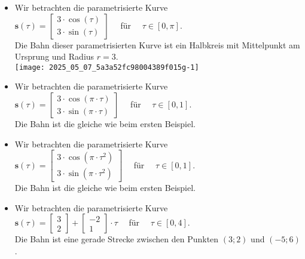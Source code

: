 \documentclass[10pt]{article}
\begin{document}
\begin{itemize}
  \item Wir betrachten die parametrisierte Kurve\\
$\mathbf{s}(\tau)=\left[\begin{array}{c}3 \cdot \cos (\tau) \\ 3 \cdot \sin (\tau)\end{array}\right] \quad$ für $\quad \tau \in[0, \pi]$.\\
Die Bahn dieser parametrisierten Kurve ist ein Halbkreis mit Mittelpunkt am Ursprung und Radius $r=3$.\\
\texttt{[image: 2025\_05\_07\_5a3a52fc98004389f015g-1]}
  \item Wir betrachten die parametrisierte Kurve\\
$\mathbf{s}(\tau)=\left[\begin{array}{c}3 \cdot \cos (\pi \cdot \tau) \\ 3 \cdot \sin (\pi \cdot \tau)\end{array}\right] \quad$ für $\quad \tau \in[0,1]$.\\
Die Bahn ist die gleiche wie beim ersten Beispiel.
  \item Wir betrachten die parametrisierte Kurve\\
$\mathbf{s}(\tau)=\left[\begin{array}{c}3 \cdot \cos \left(\pi \cdot \tau^{2}\right) \\ 3 \cdot \sin \left(\pi \cdot \tau^{2}\right)\end{array}\right] \quad$ für $\quad \tau \in[0,1]$.\\
Die Bahn ist die gleiche wie beim ersten Beispiel.
  \item Wir betrachten die parametrisierte Kurve\\
$\mathbf{s}(\tau)=\left[\begin{array}{l}3 \\ 2\end{array}\right]+\left[\begin{array}{r}-2 \\ 1\end{array}\right] \cdot \tau \quad$ für $\quad \tau \in[0,4]$.\\
Die Bahn ist eine gerade Strecke zwischen den Punkten $(3 ; 2)$ und $(-5 ; 6)$.
\end{itemize}
\end{document}
